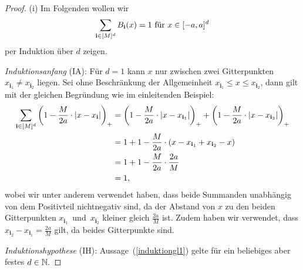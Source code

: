 \begin{proof}
(i) Im Folgenden wollen wir 
\begin{equation}
\label{induktiongl1}
\sum_{\mathbf{i} \in [M]^d} B_{\mathbf{i}}(x) = 1 \text{ für } x \in [-a , a]^d
\end{equation}
per Induktion über $d$ zeigen. 
	
	 \emph{Induktionsanfang} (IA): Für $d = 1$ kann $x$ nur zwischen zwei Gitterpunkten $x_{\mathbf{i}_1} \neq x_{\mathbf{i}_2}$ liegen. Sei ohne Beschränkung der Allgemeinheit $x_{\mathbf{i}_1}\leq x \leq x_{\mathbf{i}_2}$, dann gilt mit der gleichen Begründung wie im einleitenden Beispiel:
	\begin{equation*}
	\begin{split}
	\sum_{\mathbf{i} \in [M]^d} \bigg(1 - \frac{M}{2a} \cdot |x - x_{\mathbf{i}}|\bigg)_+ & = \bigg(1 - \frac{M}{2a} \cdot |x - x_{\mathbf{i}_1}|\bigg)_+ + \bigg(1 - \frac{M}{2a} \cdot |x - x_{\mathbf{i}_2}|\bigg)_+ \\
	& = 1 + 1 - \frac{M}{2a} \cdot (x - x_{\mathbf{i}_1} + x_{\mathbf{i}_2} - x) \\
	& = 1 + 1 - \frac{M}{2a} \cdot \frac{2a}{M} \\
	& = 1,
	\end{split}
	\end{equation*} wobei wir unter anderem verwendet haben, dass beide Summanden unabhängig von dem Positivteil nichtnegativ sind, da der Abstand von $x$ zu den beiden Gitterpunkten $x_{\mathbf{i}_1}$~und~$x_{\mathbf{i}_2}$ kleiner gleich $\frac{2a}{M}$ ist. Zudem haben wir verwendet, dass $x_{\mathbf{i}_2} - x_{\mathbf{i}_1} = \frac{2a}{M}$ gilt, da beides Gitterpunkte sind.     
	
\emph{Induktionshypothese} (IH): Aussage~(\ref{induktiongl1}) gelte für ein beliebiges aber festes $d \in \mathbb{N}.$


\end{proof}
